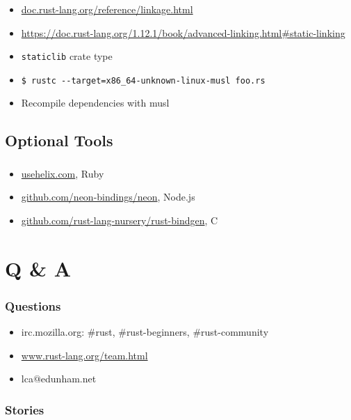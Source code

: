 \documentclass{beamer}
\begin{document}
\begin{frame}[fragile]
\frametitle{\insertsubsectionhead}

\begin{itemize}[<+(1)->]
\item \url{doc.rust-lang.org/reference/linkage.html}
\item \url{https://doc.rust-lang.org/1.12.1/book/advanced-linking.html#static-linking}
\item \verb|staticlib| crate type
\item \verb|$ rustc --target=x86_64-unknown-linux-musl foo.rs|
\item Recompile dependencies with musl
\end{itemize}

\end{frame}



\subsection{Optional Tools}

\begin{frame}[fragile]
\tableofcontents[currentsubsection]
\end{frame}


\begin{frame}[fragile]
\frametitle{\insertsubsectionhead}

\begin{itemize}[<+(1)->]
\item \url{usehelix.com}, Ruby
\item \url{github.com/neon-bindings/neon}, Node.js
\item \url{github.com/rust-lang-nursery/rust-bindgen}, C
\end{itemize}

\end{frame}

\section{Q \& A}

\begin{frame}[fragile]
\tableofcontents [currentsection]
\end{frame}

\begin{frame}[fragile]
\frametitle{Questions}
\begin{itemize}[<+(1)->]
\item irc.mozilla.org: \#rust, \#rust-beginners, \#rust-community
\item \url{www.rust-lang.org/team.html}
\item lca$@$edunham.net
\end{itemize}
\end{frame}

\begin{frame}[fragile]
\frametitle{Stories}
\end{frame}
\end{document}
